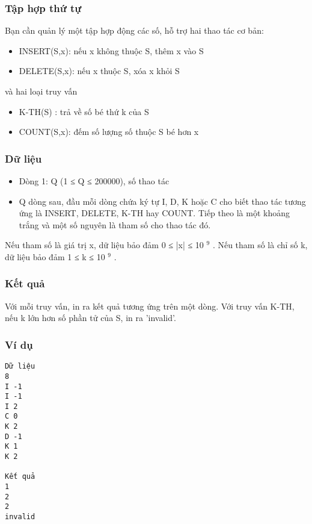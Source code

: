 



\subsubsection{   Tập hợp thứ tự  }

   Bạn cần quản lý một tập hợp động các số, hỗ trợ hai thao tác cơ bản:  
\begin{itemize}
	\item     INSERT(S,x): nếu x không thuộc S, thêm x vào S   
	\item     DELETE(S,x): nếu x thuộc S, xóa x khỏi S   
\end{itemize}

   và hai loại truy vấn  
\begin{itemize}
	\item     K-TH(S) : trả về số bé thứ k của S   
	\item     COUNT(S,x): đếm số lượng số thuộc S bé hơn x   
\end{itemize}

\subsubsection{   Dữ liệu  }
\begin{itemize}
	\item     Dòng 1: Q (1 ≤ Q ≤ 200000), số thao tác   
	\item     Q dòng sau, đầu mỗi dòng chứa ký tự I, D, K hoặc C cho biết thao tác tương ứng là INSERT, DELETE, K-TH hay COUNT. Tiếp theo là một khoảng trắng và một số nguyên là tham số cho thao tác đó.   
\end{itemize}

   Nếu tham số là giá trị x, dữ liệu bảo đảm 0 ≤ |x| ≤ 10   $^    9   $   . Nếu tham số là chỉ số k, dữ liệu bảo đảm 1 ≤ k ≤ 10   $^    9   $   .  

\subsubsection{   Kết quả  }

   Với mỗi truy vấn, in ra kết quả tương ứng trên một dòng. Với truy vấn K-TH, nếu k lớn hơn số phần tử của S, in ra 'invalid'.  

\subsubsection{   Ví dụ  }
\begin{verbatim}
Dữ liệu
8
I -1
I -1
I 2
C 0
K 2
D -1
K 1
K 2

Kết quả
1
2
2
invalid
\end{verbatim}
